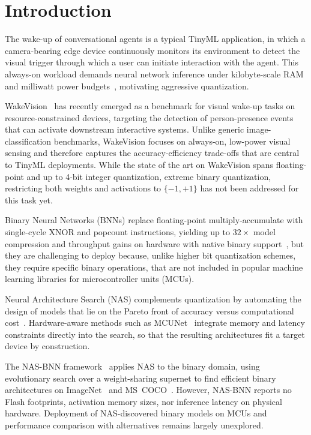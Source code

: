 \documentclass[conference]{IEEEtran}
\begin{document}
\section{Introduction}
\label{sec:intro}

The wake-up of conversational agents is a typical TinyML application, in which a camera-bearing edge device continuously monitors its environment to detect the visual trigger through which a user can initiate interaction with the agent.
This always-on workload demands neural network inference under kilobyte-scale RAM and milliwatt power budgets~\cite{banbury2021micronets}, motivating aggressive quantization.

WakeVision~\cite{banbury2025wakevision} has recently emerged as a benchmark for visual wake-up tasks on resource-constrained devices, targeting the detection of person-presence events that can activate downstream interactive systems.
Unlike generic image-classification benchmarks, WakeVision focuses on always-on, low-power visual sensing and therefore captures the accuracy-efficiency trade-offs that are central to TinyML deployments.
While the state of the art on WakeVision spans floating-point and up to 4-bit integer quantization, extreme binary quantization, restricting both weights and activations to $\{-1,+1\}$ has not been addressed for this task yet.

Binary Neural Networks (BNNs) replace floating-point multiply-accumulate with single-cycle XNOR and popcount instructions, yielding up to $32\times$ model compression and throughput gains on hardware with native binary support~\cite{rastegari2016xnor, sze2017efficient, dabbous2025binary}, but they are challenging to deploy because, unlike higher bit quantization schemes, they require specific binary operations, that are not included in popular machine learning libraries for microcontroller units (MCUs).

Neural Architecture Search (NAS) complements quantization by automating the design of models that lie on the Pareto front of accuracy versus computational cost~\cite{baymurzina2022review, liberis2021munas}. Hardware-aware methods such as MCUNet~\cite{lin2020mcunet} integrate memory and latency constraints directly into the search, so that the resulting architectures fit a target device by construction.

The NAS-BNN framework~\cite{lin2025nasbnn} applies NAS to the binary domain, using evolutionary search over a weight-sharing supernet to find efficient binary architectures on ImageNet~\cite{deng2009imagenet} and MS~COCO~\cite{lin2014microsoft}.
However, NAS-BNN reports no Flash footprints, activation memory sizes, nor inference latency on physical hardware.
Deployment of NAS-discovered binary models on MCUs and performance comparison with alternatives remains largely unexplored.
\end{document}
